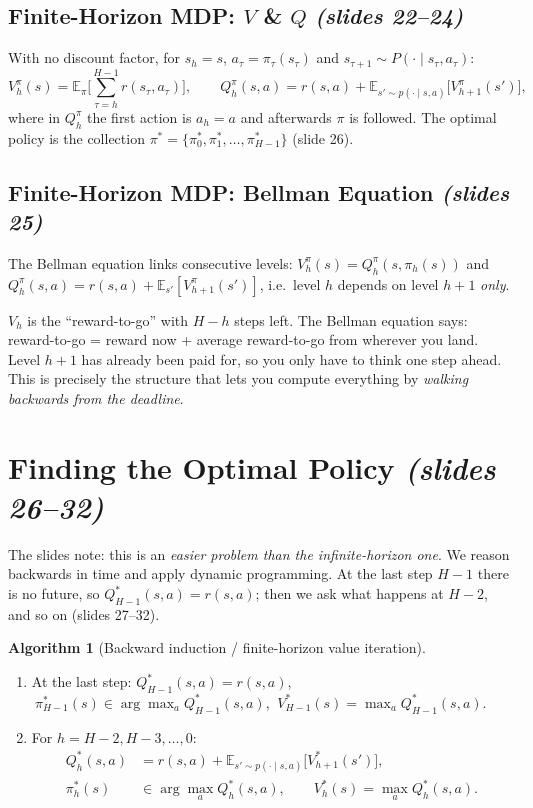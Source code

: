 \documentclass[11pt,a4paper]{article}
\newcommand{\E}{\mathbb{E}}
\newcommand{\slides}[1]{\emph{(slides #1)}}
\theoremstyle{plain}
\theoremstyle{definition}
\newtheorem{algorithm}[theorem]{Algorithm}
\theoremstyle{remark}
\begin{document}
\subsection{Finite-Horizon MDP: $V$ \& $Q$ \slides{22--24}}

With no discount factor, for $s_h=s$, $a_\tau=\pi_\tau(s_\tau)$ and $s_{\tau+1}\sim P(\cdot\mid s_\tau,a_\tau)$:
\[
V^\pi_h(s)=\E_\pi\Big[\sum_{\tau=h}^{H-1} r(s_\tau,a_\tau)\Big],\qquad
Q^\pi_h(s,a)=r(s,a)+\E_{s'\sim p(\cdot\mid s,a)}\big[V^\pi_{h+1}(s')\big],
\]
where in $Q^\pi_h$ the first action is $a_h=a$ and afterwards $\pi$ is followed. The optimal policy is the collection $\pi^*=\{\pi^*_0,\pi^*_1,\dots,\pi^*_{H-1}\}$ (slide 26).

\subsection{Finite-Horizon MDP: Bellman Equation \slides{25}}

The Bellman equation links consecutive levels: $V^\pi_h(s)=Q^\pi_h(s,\pi_h(s))$ and $Q^\pi_h(s,a)=r(s,a)+\E_{s'}[V^\pi_{h+1}(s')]$, i.e.\ level $h$ depends on level $h+1$ \emph{only}.

\begin{intuition}
$V_h$ is the ``reward-to-go'' with $H-h$ steps left. The Bellman equation says: reward-to-go = reward now + average reward-to-go from wherever you land. Level $h+1$ has already been paid for, so you only have to think one step ahead. This is precisely the structure that lets you compute everything by \emph{walking backwards from the deadline}.
\end{intuition}

\section{Finding the Optimal Policy \slides{26--32}}

The slides note: this is an \emph{easier problem than the infinite-horizon one}. We reason backwards in time and apply dynamic programming. At the last step $H-1$ there is no future, so $Q^*_{H-1}(s,a)=r(s,a)$; then we ask what happens at $H-2$, and so on (slides 27--32).

\begin{algorithm}[Backward induction / finite-horizon value iteration]\label{alg:bi}
\begin{enumerate}[nosep]
  \item At the last step: $Q^*_{H-1}(s,a)=r(s,a)$, $\ \pi^*_{H-1}(s)\in\arg\max_a Q^*_{H-1}(s,a)$, $\ V^*_{H-1}(s)=\max_a Q^*_{H-1}(s,a)$.
  \item For $h=H-2,H-3,\dots,0$:
  \begin{align*}
  Q^*_h(s,a)&=r(s,a)+\E_{s'\sim p(\cdot\mid s,a)}\big[V^*_{h+1}(s')\big],\\
  \pi^*_h(s)&\in\arg\max_a Q^*_h(s,a),\qquad V^*_h(s)=\max_a Q^*_h(s,a).
  \end{align*}
\end{enumerate}
\end{algorithm}
\end{document}
